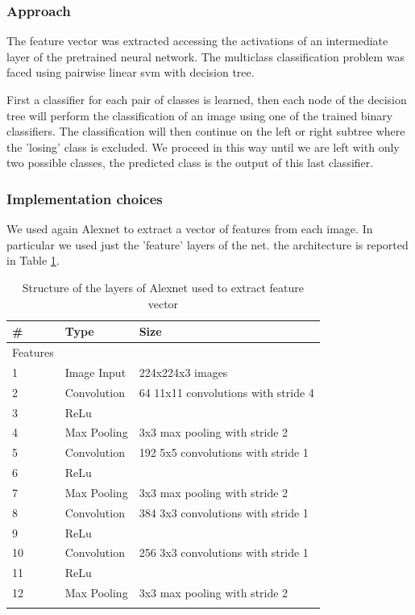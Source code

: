 \documentclass[12pt, a4paper]{report}
\begin{document}
\subsubsection*{Approach}

The feature vector was extracted accessing the activations of an intermediate layer of the pretrained neural network. The multiclass classification problem was faced using pairwise linear svm with decision tree. 

First a classifier for each pair of classes is learned, then each node of the decision tree will perform the classification of an image using one of the trained binary classifiers. The classification will then continue on the left or right subtree where the 'losing' class is excluded. We proceed in this way until we are left with only two possible classes, the predicted class is the output of this last classifier.

\subsubsection*{Implementation choices}

We used again Alexnet to extract a vector of features from each image. In particular we used just the 'feature' layers of the net. the architecture is reported in Table \ref{tab:SVM}.

\begin{table}[h!]
	\centering
	\caption{Structure of the layers of Alexnet used to extract feature vector}
	\begin{tabular}{lll}
		\# & Type & Size \\
		\midrule
		Features & & \\
		1 & Image Input & 224x224x3 images \\
		2 & Convolution & 64 11x11 convolutions with stride 4 \\
		3 & ReLu & \\
		4 & Max Pooling & 3x3 max pooling with stride 2 \\
		5 & Convolution & 192 5x5 convolutions with stride 1 \\
		6 & ReLu & \\
		7 & Max Pooling & 3x3 max pooling with stride 2 \\
		8 & Convolution & 384 3x3 convolutions with stride 1 \\
		9 & ReLu & \\
		10 & Convolution & 256 3x3 convolutions with stride 1 \\
		11 & ReLu & \\
		12 & Max Pooling & 3x3 max pooling with stride 2 \\
		\bottomrule
		\label{tab:SVM}
	\end{tabular}
\end{table}
\end{document}
